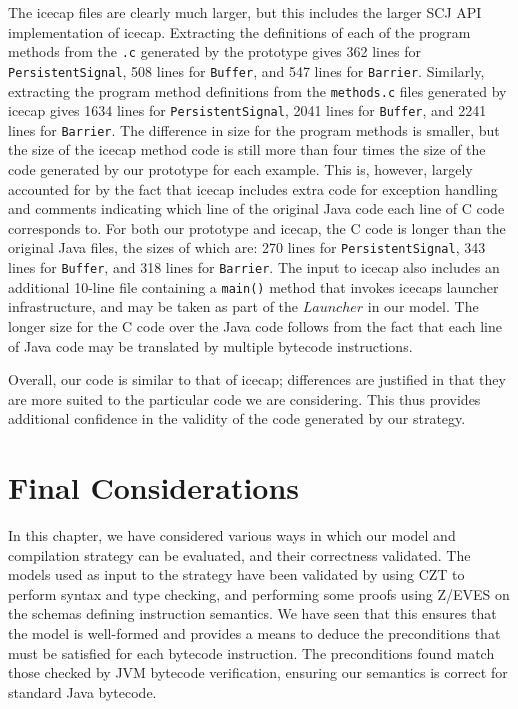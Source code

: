 {The icecap files are clearly much larger, but this includes the larger
SCJ API implementation of icecap.
Extracting the definitions of each of the program methods from the
\texttt{.c} generated by the prototype gives 362 lines for
\texttt{PersistentSignal}, 508 lines for \texttt{Buffer}, and 547
lines for \texttt{Barrier}.
Similarly, extracting the program method definitions from the
\texttt{methods.c} files generated by icecap gives 1634 lines for
\texttt{PersistentSignal}, 2041 lines for \texttt{Buffer}, and 2241
lines for \texttt{Barrier}.
The difference in size for the program methods is smaller, but the
size of the icecap method code is still more than four times the size
of the code generated by our prototype for each example.
This is, however, largely accounted for by the fact that icecap
includes extra code for exception handling and comments indicating
which line of the original Java code each line of C code corresponds
to.
For both our prototype and icecap, the C code is longer than the
original Java files, the sizes of which are: 270 lines for
\texttt{PersistentSignal}, 343 lines for \texttt{Buffer}, and 318
lines for \texttt{Barrier}.
The input to icecap also includes an additional 10-line file
containing a \texttt{main()} method that invokes icecaps launcher
infrastructure, and may be taken as part of the $Launcher$ in our
model.
The longer size for the C code over the Java code follows from the
fact that each line of Java code may be translated by multiple
bytecode instructions.

Overall, our code is similar to that of icecap; differences are
justified in that they are more suited to the particular code we are
considering.
This thus provides additional confidence in the validity of the code
generated by our strategy.
}
\section{Final Considerations}
\label{evaluation-final-considerations-section}

In this chapter, we have considered various ways in which our model
and compilation strategy can be evaluated, and their correctness
validated.
The models used as input to the strategy have been validated by using
CZT to perform syntax and type checking, and performing some proofs
using Z/EVES on the schemas defining instruction semantics.
We have seen that this ensures that the model is well-formed and
provides a means to deduce the preconditions that must be satisfied
for each bytecode instruction.
The preconditions found match those checked by JVM bytecode
verification, ensuring our semantics is correct for standard Java
bytecode.

